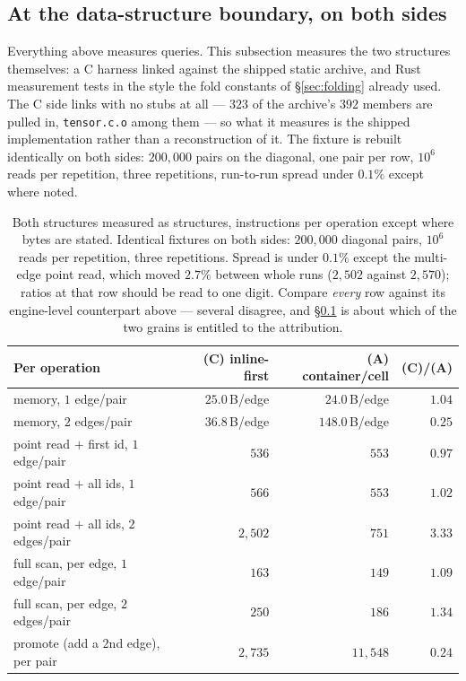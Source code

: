 \documentclass[11pt,a4paper]{article}
\theoremstyle{plain}
\theoremstyle{definition}
\theoremstyle{remark}
\begin{document}
\subsection{At the data-structure boundary, on both sides}
\label{sec:evalboundary}

Everything above measures queries. This subsection measures the two structures
themselves: a C harness linked against the shipped static archive, and
Rust measurement tests in the style the fold constants of \S\ref{sec:folding}
already used. The C side links with no stubs at all --- $323$ of the archive's
$392$ members are pulled in, \texttt{tensor.c.o} among them --- so what it
measures is the shipped implementation rather than a reconstruction of it. The
fixture is rebuilt identically on both sides: $200{,}000$ pairs on the
diagonal, one pair per row, $10^6$ reads per repetition, three repetitions,
run-to-run spread under $0.1\%$ except where noted.

\begin{table}[!ht]
\centering
\small
\begin{tabular}{@{}lrrr@{}}
\toprule
Per operation & (C) inline-first & (A) container/cell & (C)/(A) \\
\midrule
memory, $1$ edge/pair                    & $25.0$\,B/edge & $24.0$\,B/edge  & $1.04$ \\
memory, $2$ edges/pair                   & $36.8$\,B/edge & $148.0$\,B/edge & $0.25$ \\
\midrule
point read $+$ first id, $1$ edge/pair   & $536$          & $553$           & $0.97$ \\
point read $+$ all ids, $1$ edge/pair    & $566$          & $553$           & $1.02$ \\
point read $+$ all ids, $2$ edges/pair   & $2{,}502$      & $751$           & $3.33$ \\
\midrule
full scan, per edge, $1$ edge/pair       & $163$          & $149$           & $1.09$ \\
full scan, per edge, $2$ edges/pair      & $250$          & $186$           & $1.34$ \\
\midrule
promote (add a $2$nd edge), per pair      & $2{,}735$      & $11{,}548$      & $0.24$ \\
\bottomrule
\end{tabular}
\caption{Both structures measured as structures, instructions per operation
except where bytes are stated. Identical fixtures on both sides: $200{,}000$
diagonal pairs, $10^6$ reads per repetition, three repetitions. Spread is under
$0.1\%$ except the multi-edge point read, which moved $2.7\%$ between whole
runs ($2{,}502$ against $2{,}570$); ratios at that row should be read to one
digit. Compare \emph{every} row against its engine-level counterpart above ---
several disagree, and \S\ref{sec:evalboundary} is about which of the two grains
is entitled to the attribution.}
\label{tab:evalboundary}
\end{table}
\end{document}
